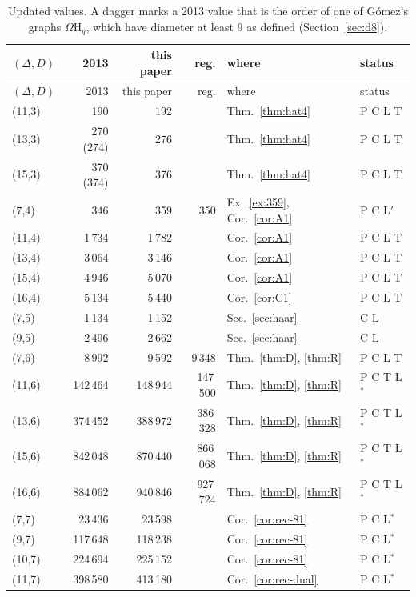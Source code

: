 \documentclass[11pt]{amsart}
\theoremstyle{definition}
\theoremstyle{remark}
\numberwithin{equation}{section}
\newcommand{\Om}{\Omega\mathrm H}
\begin{document}
\begin{longtable}{@{}l r r r l l@{}}
\caption{Updated values. A dagger marks a 2013 value that is the order of one of G\'omez's graphs $\Om_q$, which have diameter
at least 9 as defined (Section~\ref{sec:d8}).}\label{tab:updated}\\
\toprule $(\Delta,D)$ & 2013 & this paper & reg. & where & status\\ \midrule\endfirsthead
\toprule $(\Delta,D)$ & 2013 & this paper & reg. & where & status\\ \midrule\endhead
\bottomrule\endfoot
(11,3) & 190 & 192 & & Thm.~\ref{thm:hat4} & P C L T\\
(13,3) & 270 (274) & 276 & & Thm.~\ref{thm:hat4} & P C L T\\
(15,3) & 370 (374) & 376 & & Thm.~\ref{thm:hat4} & P C L T\\
(7,4) & 346 & 359 & 350 & Ex.~\ref{ex:359}, Cor.~\ref{cor:A1} & P C L$'$\\
(11,4) & 1\,734 & 1\,782 & & Cor.~\ref{cor:A1} & P C L T\\
(13,4) & 3\,064 & 3\,146 & & Cor.~\ref{cor:A1} & P C L T\\
(15,4) & 4\,946 & 5\,070 & & Cor.~\ref{cor:A1} & P C L T\\
(16,4) & 5\,134 & 5\,440 & & Cor.~\ref{cor:C1} & P C L T\\
(7,5) & 1\,134 & 1\,152 & & Sec.~\ref{sec:haar} & C L\\
(9,5) & 2\,496 & 2\,662 & & Sec.~\ref{sec:haar} & C L\\
(7,6) & 8\,992 & 9\,592 & 9\,348 & Thm.~\ref{thm:D}, \ref{thm:R} & P C L T\\
(11,6) & 142\,464 & 148\,944 & 147\,500 & Thm.~\ref{thm:D}, \ref{thm:R} & P C T L$^*$\\
(13,6) & 374\,452 & 388\,972 & 386\,328 & Thm.~\ref{thm:D}, \ref{thm:R} & P C T L$^*$\\
(15,6) & 842\,048 & 870\,440 & 866\,068 & Thm.~\ref{thm:D}, \ref{thm:R} & P C T L$^*$\\
(16,6) & 884\,062 & 940\,846 & 927\,724 & Thm.~\ref{thm:D}, \ref{thm:R} & P C T L$^*$\\
(7,7) & 23\,436 & 23\,598 & & Cor.~\ref{cor:rec-81} & P C L$^*$\\
(9,7) & 117\,648 & 118\,238 & & Cor.~\ref{cor:rec-81} & P C L$^*$\\
(10,7) & 224\,694 & 225\,152 & & Cor.~\ref{cor:rec-81} & P C L$^*$\\
(11,7) & 398\,580 & 413\,180 & & Cor.~\ref{cor:rec-dual} & P C L$^*$\\

\end{longtable}
\end{document}
